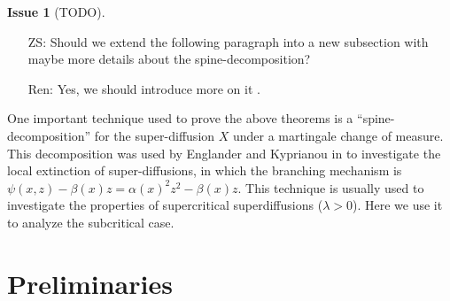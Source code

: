 \documentclass[12pt,a4paper]{amsart}
\numberwithin{equation}{section}
\theoremstyle{plain}
\theoremstyle{definition}
\newtheorem{iss}{Issue}
\begin{document}
\begin{iss}[TODO]~
  \begin{itemize}
  \item[ZS:]
Should we extend the following paragraph into a new subsection with maybe more details about the spine-decomposition?

\item[Ren:] 
  Yes, we should introduce more on it .  
\end{itemize}
\end{iss}
One important technique used to prove the above theorems is a ``spine-decomposition'' for the super-diffusion $X$ under a martingale change of measure.
This decomposition was used by Englander and Kyprianou in \cite{EnglanderKyprianou2004Local} to investigate the local extinction of super-diffusions, in which the branching mechanism is $\psi(x,z)-\beta(x)z=\alpha(x)^2z^2-\beta(x)z$.
This technique is usually used to investigate the properties of supercritical superdiffusions ($\lambda>0$).
Here we use it to analyze the subcritical case.

\section{Preliminaries}
\end{document}
